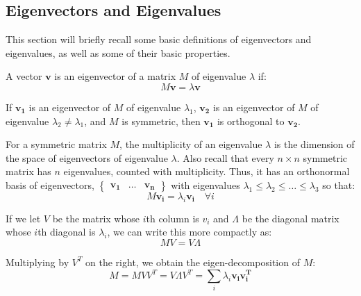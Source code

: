\subsection{Eigenvectors and Eigenvalues}
\label{eigenvectors}
\label{eigenvalues}
This section will briefly recall some basic definitions of eigenvectors and
eigenvalues, as well as some of their basic properties.

A vector $\mathbf{v}$ is an eigenvector of a matrix $M$ of eigenvalue $\lambda$
if:
\begin{equation}
    M\mathbf{v} = \lambda\textbf{v}
\end{equation}

If $\mathbf{v_1}$ is an eigenvector of $M$ of eigenvalue $\lambda_1$,
$\mathbf{v_2}$ is an eigenvector of $M$ of eigenvalue $\lambda_2\neq\lambda_1$,
and $M$ is symmetric, then $\mathbf{v_1}$ is orthogonal to $\mathbf{v_2}$.

For a symmetric matrix $M$, the multiplicity of an eigenvalue $\lambda$ is the
dimension of the space of eigenvectors of eigenvalue $\lambda$. Also recall that
every $n \times n$ symmetric matrix has $n$ eigenvalues, counted with
multiplicity. Thus, it has an orthonormal basis of eigenvectors,
$\begin{Bmatrix} \mathbf{v_1} & \ldots & \mathbf{v_n} \end{Bmatrix}$ with
eigenvalues $\lambda_1\leq\lambda_2\leq\ldots\leq\lambda_3$ so that:
\begin{equation}
    M\mathbf{v_i} = \lambda_i \mathbf{v_i} \quad \forall i
\end{equation}

If we let $V$ be the matrix whose $i$th column is $v_i$ and $\Lambda$ be the
diagonal matrix whose $i$th diagonal is $\lambda_i$, we can write this more
compactly as:
\begin{equation}
    MV = V\Lambda
\end{equation}

Multiplying by $V^T$ on the right, we obtain the eigen-decomposition of $M$:
\begin{equation}
    M = MVV^T = V{\Lambda}V^T = \sum_i \lambda_i \mathbf{v_i} \mathbf{v_i^T}
\end{equation}

